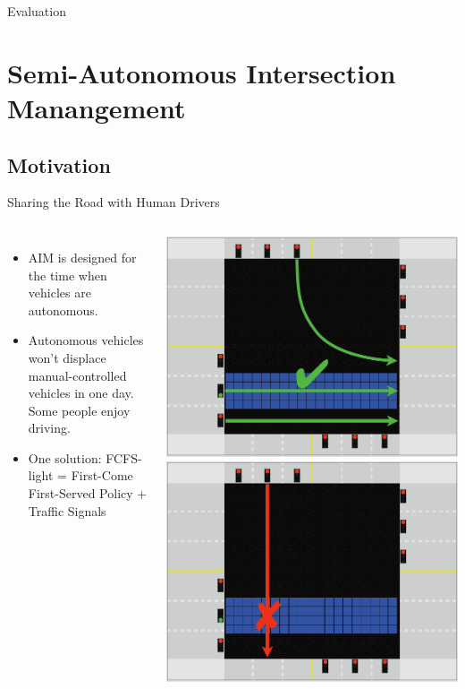 \documentclass{beamer}
\begin{document}
\begin{frame}{Evaluation}
\end{frame}

\section{Semi-Autonomous Intersection Manangement}

\subsection{Motivation}

\begin{frame}{Sharing the Road with Human Drivers}
\begin{columns}[c]
\begin{itemize}
\item AIM is designed for the time when vehicles are autonomous.
\item Autonomous vehicles won’t displace manual-controlled vehicles in one
day. Some people enjoy driving.
\item One solution: FCFS-light = First-Come First-Served Policy + Traffic Signals
\end{itemize}
\includegraphics[width=\textwidth]{fcfs-light-1.png}
\hfill
\includegraphics[width=\textwidth]{fcfs-light-2.png}

\end{columns}
\end{frame}
\end{document}
